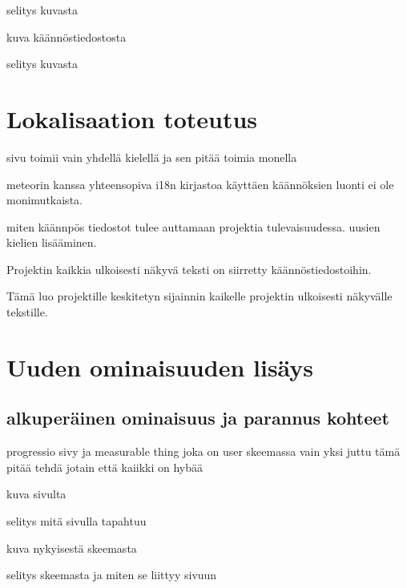 \documentclass[11pt,a4paper,titlepage,oneside]{article}
\begin{document}
selitys kuvasta

kuva käännöstiedostosta

selitys kuvasta









\newpage


\section{Lokalisaation toteutus}

sivu toimii vain yhdellä kielellä ja sen pitää toimia monella
\medskip


meteorin kanssa yhteensopiva i18n kirjastoa käyttäen käännöksien luonti ei ole monimutkaista.






miten käännpös tiedostot tulee auttamaan projektia tulevaisuudessa. uusien kielien lisääminen.

Projektin kaikkia ulkoisesti näkyvä teksti on siirretty käännöstiedostoihin. 

Tämä luo projektille keskitetyn sijainnin kaikelle projektin ulkoisesti näkyvälle tekstille.










\section{Uuden ominaisuuden lisäys}

\subsection{alkuperäinen ominaisuus ja parannus kohteet}
progressio sivy ja measurable thing joka on user skeemassa vain yksi juttu
tämä pitää tehdä jotain että kaiikki on hybää
\medskip

kuva sivulta

selitys mitä sivulla tapahtuu
\medskip

kuva nykyisestä skeemasta

selitys skeemasta ja miten se liittyy sivuun
\medskip
\end{document}
